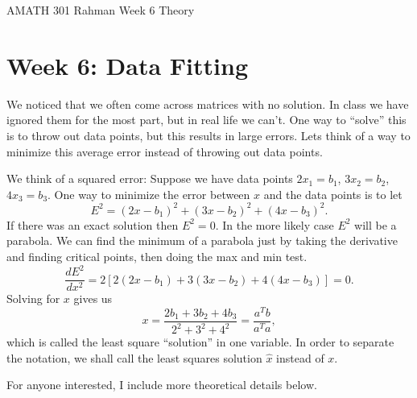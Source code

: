 \documentclass[reqno]{amsart}
\theoremstyle{definition}
\begin{document}
\begin{flushleft}
{\sc \Large AMATH 301 Rahman} \hfill Week 6 Theory
\bigskip
\end{flushleft}

\newcommand{\R}{\mathbb{R}}
\newcommand{\N}{\mathbb{N}}
\newcommand{\Z}{\mathbb{Z}}
\newcommand{\Q}{\mathbb{Q}}
\renewcommand{\CancelColor}{\color{red}}
\newcommand{\?}{\stackrel{?}{=}}
\renewcommand{\varphi}{\phi}
\newcommand{\card}{\text{Card}}
\newcommand{\bigzero}{\text{\Huge 0}}
\newcommand{\curvearrowdown}{{\color{red}\rotatebox{90}{$\curvearrowleft$}}}
\newcommand{\curvearrowup}{{\color{red}\rotatebox{90}{$\curvearrowright$}}}



\section*{Week 6:  Data Fitting}

We noticed that we often come across matrices with no solution.  In class we have ignored them for the
most part, but in real life we can't.  One way to ``solve'' this is to throw out data points, but this results
in large errors.  Lets think of a way to minimize this average error instead of throwing out data points.

We think of a squared error:  Suppose we have data points $2x_1 = b_1$, $3x_2 = b_2$, $4x_3 = b_3$.
One way to minimize the error between $x$ and the data points is to let
%
\begin{equation*}
E^2 = (2x - b_1)^2 + (3x - b_2)^2 + (4x - b_3)^2.
\end{equation*}
%
If there was an exact solution then $E^2 = 0$.  In the more likely case $E^2$ will be a parabola.  We can find
the minimum of a parabola just by taking the derivative and finding critical points, then doing the max and min
test.
%
\begin{equation*}
\frac{dE^2}{dx^2} = 2[2(2x - b_1) + 3(3x - b_2) + 4(4x - b_3)] = 0.
\end{equation*}
%
Solving for $x$ gives us
%
\begin{equation*}
x = \frac{2b_1 + 3b_2 + 4b_3}{2^2 + 3^2 + 4^2} = \frac{a^Tb}{a^Ta},
\end{equation*}
%
which is called the least square ``solution'' in one variable.  In order to separate the notation, we shall call
the least squares solution $\hat{x}$ instead of $x$.

\bigskip
\bigskip
\bigskip
\bigskip

{\color{blue} For anyone interested, I include more theoretical details below.}
\end{document}

